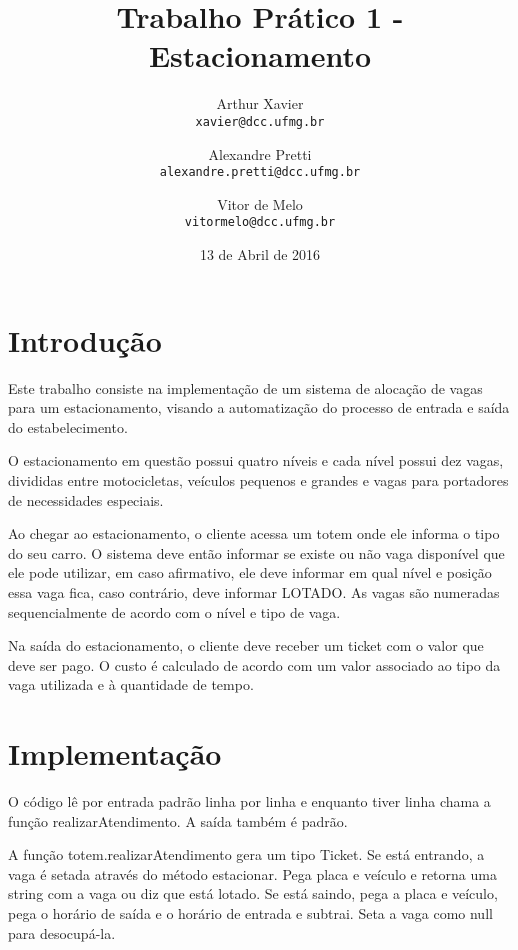 \documentclass[a4paper,12pt]{article}
\title{Trabalho Prático 1 - Estacionamento}
\author{
    Arthur Xavier\\
    \texttt{xavier@dcc.ufmg.br}
    \and
    Alexandre Pretti\\
    \texttt{alexandre.pretti@dcc.ufmg.br}
    \and
    Vitor de Melo\\
    \texttt{vitormelo@dcc.ufmg.br}
}
\date{13 de Abril de 2016}
\begin{document}
\maketitle

\section{Introdução}

Este trabalho consiste na implementação de um sistema de alocação de vagas para um estacionamento, visando a automatização do processo de entrada e saída do estabelecimento.

O estacionamento em questão possui quatro níveis e cada nível possui dez vagas, divididas entre motocicletas, veículos pequenos e grandes e vagas para portadores de necessidades especiais.

Ao chegar ao estacionamento, o cliente acessa um totem onde ele informa o tipo do seu carro. O sistema deve então informar se existe ou não vaga disponível que ele pode utilizar, em caso afirmativo, ele deve informar em qual nível e posição essa vaga fica, caso contrário, deve informar LOTADO. As vagas são numeradas sequencialmente de acordo com o nível e tipo de vaga.

Na saída do estacionamento, o cliente deve receber um ticket com o valor que deve ser pago. O custo é calculado de acordo com um valor associado ao tipo da vaga utilizada e à quantidade de tempo.

\newpage

\section{Implementação}


O código lê por entrada padrão linha por linha e enquanto tiver linha chama a função realizarAtendimento. A saída também é padrão.

A função totem.realizarAtendimento gera um tipo Ticket. Se está entrando, a vaga é setada através do método estacionar. Pega placa e veículo e retorna uma string com a vaga ou diz que está lotado. Se está saindo, pega a placa e veículo, pega o horário de saída e o horário de entrada e subtrai. Seta a vaga como null para desocupá-la.
\end{document}
